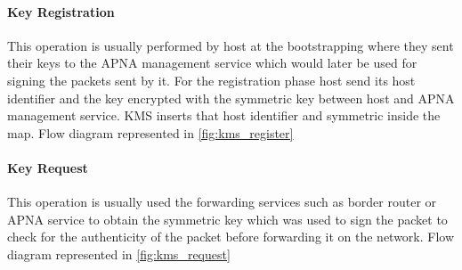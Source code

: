 \paragraph{Key Registration}
This operation is usually performed by host at the bootstrapping where they sent their keys to the APNA management service which would later be used for signing the packets sent by it. For the registration phase host send its host identifier and the key encrypted with the symmetric key between host and APNA management service. KMS inserts that host identifier and symmetric inside the map. Flow diagram represented in \ref{fig:kms_register}

\paragraph{Key Request}
This operation is usually used the forwarding services such as border router or APNA service to obtain the symmetric key which was used to sign the packet to check for the authenticity of the packet before forwarding it on the network.  Flow diagram represented in \ref{fig:kms_request}

